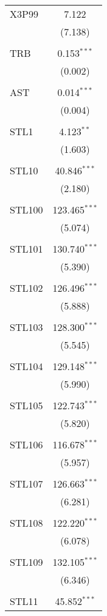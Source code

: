 \begin{table}[!htbp]
\begin{tabular}{@{\extracolsep{5pt}}lc}
 X3P99 & 7.122 \\ 
  & (7.138) \\ 
  & \\ 
 TRB & 0.153$^{***}$ \\ 
  & (0.002) \\ 
  & \\ 
 AST & 0.014$^{***}$ \\ 
  & (0.004) \\ 
  & \\ 
 STL1 & 4.123$^{**}$ \\ 
  & (1.603) \\ 
  & \\ 
 STL10 & 40.846$^{***}$ \\ 
  & (2.180) \\ 
  & \\ 
 STL100 & 123.465$^{***}$ \\ 
  & (5.074) \\ 
  & \\ 
 STL101 & 130.740$^{***}$ \\ 
  & (5.390) \\ 
  & \\ 
 STL102 & 126.496$^{***}$ \\ 
  & (5.888) \\ 
  & \\ 
 STL103 & 128.300$^{***}$ \\ 
  & (5.545) \\ 
  & \\ 
 STL104 & 129.148$^{***}$ \\ 
  & (5.990) \\ 
  & \\ 
 STL105 & 122.743$^{***}$ \\ 
  & (5.820) \\ 
  & \\ 
 STL106 & 116.678$^{***}$ \\ 
  & (5.957) \\ 
  & \\ 
 STL107 & 126.663$^{***}$ \\ 
  & (6.281) \\ 
  & \\ 
 STL108 & 122.220$^{***}$ \\ 
  & (6.078) \\ 
  & \\ 
 STL109 & 132.105$^{***}$ \\ 
  & (6.346) \\ 
  & \\ 
 STL11 & 45.852$^{***}$ \\ 

\end{tabular}
\end{table}
